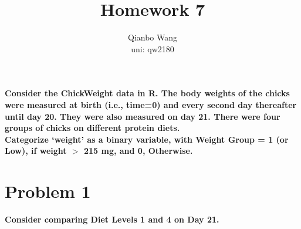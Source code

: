 \documentclass[10pt,letterpaper]{article}
\title{\textbf {Homework 7}}
\author{{Qianbo Wang}\\{uni: qw2180}}
\date{}
\begin{document}
\maketitle
\thispagestyle{fancy}
\vspace{-2em}

\textbf{Consider the ChickWeight data in R. The body weights of the chicks were measured at birth (i.e., time=0) and every second day thereafter until day 20. They were also measured on day 21. There were four groups of chicks on different protein diets.}\\

\textbf{Categorize ‘weight’ as a binary variable, with Weight Group = 1 (or Low), if weight $>$ 215 mg, and 0, Otherwise.}

\section*{Problem 1}
\textbf{Consider comparing Diet Levels 1 and 4 on Day 21.}
\end{document}
